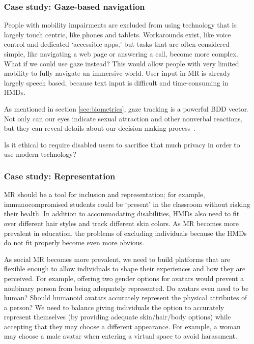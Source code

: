 \subsubsection{Case study: Gaze-based navigation}

People with mobility impairments are excluded from using technology that is largely touch centric, like phones and tablets. Workarounds exist, like voice control and dedicated `accessible apps,' but tasks that are often considered simple, like navigating a web page or answering a call, become more complex. What if we could use gaze instead? This would allow people with very limited mobility to fully navigate an immersive world. User input in MR is already largely speech based, because text input is difficult and time-consuming in HMDs.

As mentioned in section \ref{sec:biometrics}, gaze tracking is a powerful BDD vector. Not only can our eyes indicate sexual attraction and other nonverbal reactions, but they can reveal details about our decision making process~\cite{costandi}.

Is it ethical to require disabled users to sacrifice that much privacy in order to use modern technology?


\subsubsection{Case study: Representation}

MR should be a tool for inclusion and representation; for example, immunocompromised students could be `present' in the classroom without risking their health.  In addition to accommodating disabilities, HMDs also need to fit over different hair styles and track different skin colors. As MR becomes more prevalent in education, the problems of excluding individuals because the HMDs do not fit properly become even more obvious.

As social MR becomes more prevalent, we need to build platforms that are flexible enough to allow individuals to shape their experiences and how they are perceived. For example, offering two gender options for avatars would prevent a nonbinary person from being adequately represented. Do avatars even need to be human? Should humanoid avatars accurately represent the physical attributes of a person? We need to balance giving individuals the option to accurately represent themselves (by providing adequate skin/hair/body options) while accepting that they may choose a different appearance. For example, a woman may choose a male avatar when entering a virtual space to avoid harassment.

